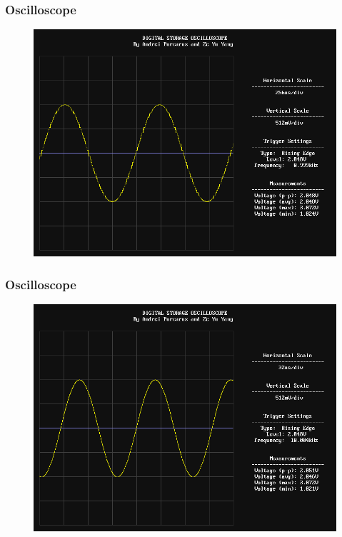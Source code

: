 \documentclass[pdf]{beamer}
\begin{document}
\begin{frame}
\frametitle{Oscilloscope}
\begin{figure}[!htb]
  \includegraphics[height=0.8\textheight]{test-results/scope_demo_1kHz.png}
\end{figure}
\end{frame}

\begin{frame}
\frametitle{Oscilloscope}
\begin{figure}[!htb]
  \includegraphics[height=0.8\textheight]{test-results/scope_demo_10kHz.png}
\end{figure}
\end{frame}
\end{document}
